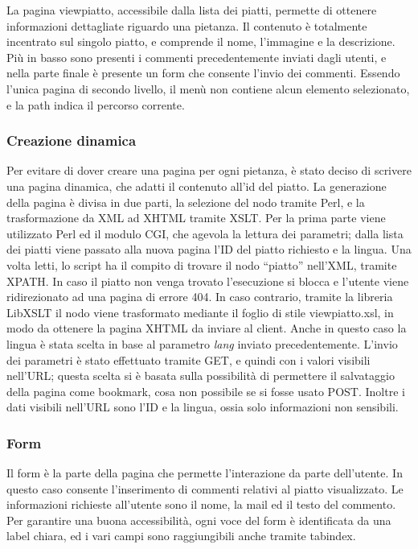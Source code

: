 \documentclass[10pt,a4paper,onecolumn]{article}
\begin{document}
La pagina viewpiatto, accessibile dalla lista dei piatti, permette di ottenere informazioni dettagliate riguardo una pietanza. Il contenuto è totalmente incentrato sul singolo piatto, e comprende il nome, l’immagine e la descrizione. Più in basso sono presenti i commenti precedentemente inviati dagli utenti, e nella parte finale è presente un form che consente l’invio dei commenti.
Essendo l’unica pagina di secondo livello, il menù non contiene alcun elemento selezionato, e la path indica il percorso corrente.

\subsubsection{Creazione dinamica}

Per evitare di dover creare una pagina per ogni pietanza, è stato deciso di scrivere una pagina dinamica, che adatti il contenuto all’id del piatto.
La generazione della pagina è divisa in due parti, la selezione del nodo tramite Perl, e la trasformazione da XML ad XHTML tramite XSLT.
Per la prima parte viene utilizzato Perl ed il modulo CGI, che agevola la lettura dei parametri; dalla lista dei piatti viene passato alla nuova pagina l’ID del piatto richiesto e la lingua. Una volta letti, lo script ha il compito di trovare il nodo ``piatto'' nell’XML, tramite XPATH. In caso il piatto non venga trovato l'esecuzione si blocca e l'utente viene ridirezionato ad una pagina di errore 404.
In caso contrario, tramite la libreria LibXSLT il nodo viene trasformato mediante il foglio di stile viewpiatto.xsl, in modo da ottenere la pagina XHTML da inviare al client. Anche in questo caso la lingua è stata scelta in base al parametro \textit{lang} inviato precedentemente.
L’invio dei parametri è stato effettuato tramite GET, e quindi con i valori visibili nell’URL; questa scelta si è basata sulla possibilità di permettere il salvataggio della pagina come bookmark, cosa non possibile se si fosse usato POST. Inoltre i dati visibili nell’URL sono l’ID e la lingua, ossia solo informazioni non sensibili.

\subsubsection{Form}

Il form è la parte della pagina che permette l’interazione da parte dell’utente. In questo caso consente l’inserimento di commenti relativi al piatto visualizzato.
Le informazioni richieste all’utente sono il nome, la mail ed il testo del commento.
Per garantire una buona accessibilità, ogni voce del form è identificata da una label chiara, ed i vari campi sono raggiungibili anche tramite tabindex.
\end{document}
